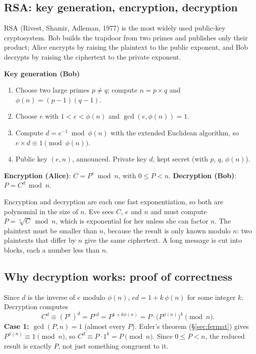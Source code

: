 \subsection{RSA: key generation, encryption, decryption \new}

RSA (Rivest, Shamir, Adleman, 1977) is the most widely used public-key cryptosystem. Bob builds the trapdoor from two primes and publishes only their product; Alice encrypts by raising the plaintext to the public exponent, and Bob decrypts by raising the ciphertext to the private exponent.

\begin{mustknow}[: RSA]
\textbf{Key generation (Bob)}
\begin{enumerate}[leftmargin=1.6em,itemsep=0pt,topsep=1pt]
  \item Choose two large primes $p \ne q$; compute $n = p \times q$ and $\phi(n) = (p-1)(q-1)$.
  \item Choose $e$ with $1 < e < \phi(n)$ and $\gcd(e, \phi(n)) = 1$.
  \item Compute $d = e^{-1} \bmod \phi(n)$ with the extended Euclidean algorithm, so $e \times d \equiv 1 \pmod{\phi(n)}$.
  \item Public key $(e, n)$, announced. Private key $d$, kept secret (with $p$, $q$, $\phi(n)$).
\end{enumerate}
\textbf{Encryption (Alice)}: $C = P^e \bmod n$, \;with $0 \le P < n$. \qquad \textbf{Decryption (Bob)}: $P = C^d \bmod n$.
\end{mustknow}

Encryption and decryption are each one fast exponentiation, so both are polynomial in the size of $n$. Eve sees $C$, $e$ and $n$ and must compute $P = \sqrt[e]{C} \bmod n$, which is exponential for her unless she can factor $n$. The plaintext must be smaller than $n$, because the result is only known modulo $n$: two plaintexts that differ by $n$ give the same ciphertext. A long message is cut into blocks, each a number less than $n$.

\subsection{Why decryption works: proof of correctness \new}

Since $d$ is the inverse of $e$ modulo $\phi(n)$, $ed = 1 + k\,\phi(n)$ for some integer $k$. Decryption computes
\[
C^d \equiv (P^e)^d = P^{ed} = P^{1 + k\phi(n)} = P \cdot \big(P^{\phi(n)}\big)^k \pmod n.
\]
\textbf{Case 1: $\gcd(P, n) = 1$} (almost every $P$). Euler's theorem (\S\ref{sec:fermat}) gives $P^{\phi(n)} \equiv 1 \pmod n$, so $C^d \equiv P \cdot 1^k = P \pmod n$. Since $0 \le P < n$, the reduced result is exactly $P$, not just something congruent to it.

